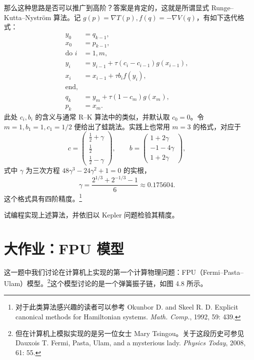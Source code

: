 那么这种思路是否可以推广到高阶？答案是肯定的，这就是所谓显式 Runge--Kutta--Nyström 算法。记 $g(p)=\nabla T(p),f(q)=-\nabla V(q)$，有如下迭代格式：
\begin{equation}
\begin{aligned}
y_0&=q_{k-1},\\
x_0&=p_{k-1},\\
\text{do }i&=1,m,\\
y_i&=y_{i-1}+\tau(c_i-c_{i-1})g(x_{i-1}),\\
x_i&=x_{i-1}+\tau b_i f(y_i),\\
\text{end},\\
q_k&=y_m+\tau(1-c_m)g(x_m),\\
p_k&=x_m.
\end{aligned}
\tag{4.4.28}
\end{equation}
此处 $c_i,b_i$ 的含义与通常 R--K 算法中的类似，并默认取 $c_0=0$。令 $m=1,b_1=1,c_1=1/2$ 便给出了蛙跳法。实践上也常用 $m=3$ 的格式，对应于
\[
c=\begin{pmatrix}\frac12+\gamma\\[2pt]\frac12\\[2pt]\frac12-\gamma\end{pmatrix},\qquad
b=\begin{pmatrix}1+2\gamma\\-1-4\gamma\\1+2\gamma\end{pmatrix},
\]
式中 $\gamma$ 为三次方程 $48\gamma^3-24\gamma^2+1=0$ 的实根，
\[
\gamma=\frac{2^{1/3}+2^{-1/3}-1}{6}\approx0.175604.
\]
这个格式具有四阶精度。\footnote{对于此类算法感兴趣的读者可以参考 Okunbor D. and Skeel R. D. Explicit canonical methods for Hamiltonian systems. \textit{Math. Comp.}, 1992, 59: 439.}

\begin{exerciseBox}[练习 4.3]
试编程实现上述算法，并依旧以 Kepler 问题检验其精度。
\end{exerciseBox}

\section*{大作业：FPU 模型}

这一题中我们讨论在计算机上实现的第一个计算物理问题：FPU（Fermi--Pasta--Ulam）模型。\footnote{但在计算机上模拟实现的是另一位女士 Mary Tsingou。关于这段历史可参见 Dauxois T. Fermi, Pasta, Ulam, and a mysterious lady. \textit{Physics Today}, 2008, 61: 55.}这个模型讨论的是一个弹簧振子链，如图 4.8 所示。


